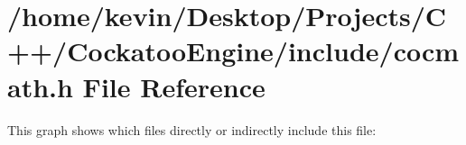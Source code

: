 \hypertarget{a00002}{}\section{/home/kevin/\+Desktop/\+Projects/\+C++/\+Cockatoo\+Engine/include/cocmath.h File Reference}
\label{a00002}
This graph shows which files directly or indirectly include this file\+:
